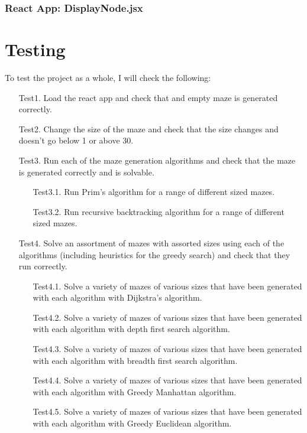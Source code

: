 \documentclass[titlepage]{article}
\begin{document}
\subsubsection{React App: DisplayNode.jsx}

\newpage
\section{Testing}
To test the project as a whole, I will check the following:
\begin{enumerate}
    \item[Test1.] Load the react app and check that and empty maze is generated correctly.
    \item[Test2.] Change the size of the maze and check that the size changes and doesn't go below 1 or above 30.
    \item[Test3.] Run each of the maze generation algorithms and check that the maze is generated correctly and is solvable.
    \begin{enumerate}
        \item[Test3.1.] Run Prim's algorithm for a range of different sized mazes.
        \item[Test3.2.] Run recursive backtracking algorithm for a range of different sized mazes. 
    \end{enumerate} 
    \item[Test4.] Solve an assortment of mazes with assorted sizes using each of the algorithms (including heuristics for the greedy search) and check that they run correctly.
    \begin{enumerate}
        \item[Test4.1.] Solve a variety of mazes of various sizes that have been generated with each algorithm with Dijkstra's algorithm.
        \item[Test4.2.] Solve a variety of mazes of various sizes that have been generated with each algorithm with depth first search algorithm.
        \item[Test4.3.] Solve a variety of mazes of various sizes that have been generated with each algorithm with breadth first search algorithm.
        \item[Test4.4.] Solve a variety of mazes of various sizes that have been generated with each algorithm with Greedy Manhattan algorithm.
        \item[Test4.5.] Solve a variety of mazes of various sizes that have been generated with each algorithm with Greedy Euclidean algorithm.

\end{enumerate}
\end{enumerate}
\end{document}
